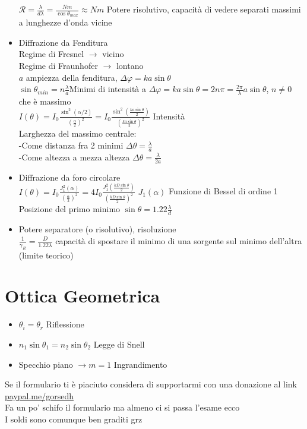 \documentclass[a4paper]{article}
\begin{document}
\begin{itemize}
$\mathcal{R}=\frac{\lambda}{d\lambda}=\frac{Nm}{ \cos\theta_{max}}\approx Nm $\hspace{4mm} Potere risolutivo, capacità di vedere separati massimi a lunghezze d'onda vicine
\item Diffrazione da Fenditura\\
Regime di Fresnel $\rightarrow$ vicino\\
Regime di Fraunhofer $\rightarrow$ lontano\\
$a$ ampiezza della fenditura, $\Delta \varphi=ka\sin\theta$\\
$\sin\theta_{min}=n\frac{\lambda}{a}$\hspace{4mm}Minimi di intensità a $\Delta \varphi=ka\sin\theta=2n\pi=\frac{2\pi}{\lambda}a\sin\theta$, $n\neq0$ che è massimo\\
$I(\theta)=I_0\frac{\sin^2{(\alpha / 2)}}{(\frac{\alpha}{2})^2}=I_0\frac{\sin^2{(\frac{ka\sin \theta}{2})}}{(\frac{ka\sin \theta}{2})^2}$\hspace{4mm} Intensità\\
Larghezza del massimo centrale:\\
-Come distanza fra 2 minimi \hspace{4mm} $\Delta \theta =\frac{\lambda}{a}$\\
-Come altezza a mezza altezza \hspace{4mm} $\Delta \theta =\frac{\lambda}{2a}$\\
\item Diffrazione da foro circolare\\
$I(\theta)=I_0\frac{J^2_1(\alpha)}{(\frac{\alpha}{2})^2}=4I_0\frac{J^2_1(\frac{kD\sin\theta}{2})}{(\frac{kD\sin\theta}{2})^2}$\hspace{4mm} $J_1(\alpha)$ Funzione di Bessel di ordine 1\\
Posizione del primo minimo $\sin\theta=1.22\frac{\lambda}{d}$\\
\item Potere separatore (o risolutivo), risoluzione\\
$\frac{1}{\gamma_R}=\frac{D}{1.22\lambda}$ capacità di spostare il minimo di una sorgente sul minimo dell'altra (limite teorico)

\end{itemize}
\section{Ottica Geometrica}
\begin{itemize}
	\item $\theta_i=\theta_r$ Riflessione
	\item $n_1\sin\theta_1=n_2\sin\theta_2$ Legge di Snell
	\item Specchio piano $\rightarrow m=1$ Ingrandimento
\end{itemize}

Se il formulario ti è piaciuto considera di supportarmi con una donazione al link \href{paypal.me/gorsedh}{paypal.me/gorsedh}\\
Fa un po' schifo il formulario ma almeno ci si passa l'esame ecco\\
I soldi sono comunque ben graditi grz
\end{document}

